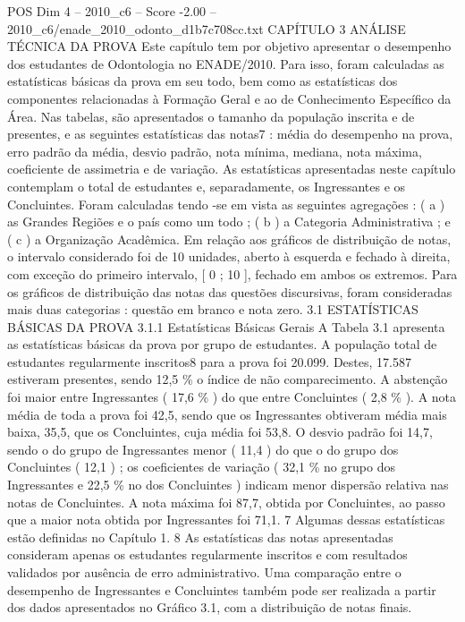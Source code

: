 \begin{textsample}{POS Dim 4 – 2010\_c6 – Score -2.00 – 2010\_c6/enade\_2010\_odonto\_d1b7c708cc.txt}  \label{ex:f4_pos_317}
CAPÍTULO 3 ANÁLISE TÉCNICA DA PROVA Este capítulo tem por objetivo apresentar o desempenho dos estudantes de Odontologia no ENADE/2010.
Para isso, foram calculadas as estatísticas básicas da prova em seu todo, bem como as estatísticas dos componentes relacionadas à Formação Geral e ao de Conhecimento Específico da Área.
Nas tabelas, são apresentados o tamanho da população inscrita e de presentes, e as seguintes estatísticas das notas7 : média do desempenho na prova, erro padrão da média, desvio padrão, nota mínima, mediana, nota máxima, coeficiente de assimetria e de variação.
As estatísticas apresentadas neste capítulo contemplam o total de estudantes e, separadamente, os Ingressantes e os Concluintes.
Foram calculadas tendo -se em vista as seguintes agregações : ( a ) as Grandes Regiões e o país como um todo ; ( b ) a Categoria Administrativa ; e ( c ) a Organização Acadêmica.
Em relação aos gráficos de distribuição de notas, o intervalo considerado foi de 10 unidades, aberto à esquerda e fechado à direita, com exceção do primeiro intervalo, [ 0 ; 10 ], fechado em ambos os extremos.
Para os gráficos de distribuição das notas das questões discursivas, foram consideradas mais duas categorias : questão em branco e nota zero. 3.1 ESTATÍSTICAS BÁSICAS DA PROVA 3.1.1 Estatísticas Básicas Gerais A Tabela 3.1 apresenta as estatísticas básicas da prova por grupo de estudantes.
A população total de estudantes regularmente inscritos8 para a prova foi 20.099.
Destes, 17.587 estiveram presentes, sendo 12,5 \% o índice de não comparecimento.
A abstenção foi maior entre Ingressantes ( 17,6 \% ) do que entre Concluintes ( 2,8 \% ).
A nota média de toda a prova foi 42,5, sendo que os Ingressantes obtiveram média mais baixa, 35,5, que os Concluintes, cuja média foi 53,8.
O desvio padrão foi 14,7, sendo o do grupo de Ingressantes menor ( 11,4 ) do que o do grupo dos Concluintes ( 12,1 ) ; os coeficientes de variação ( 32,1 \% no grupo dos Ingressantes e 22,5 \% no dos Concluintes ) indicam menor dispersão relativa nas notas de Concluintes.
A nota máxima foi 87,7, obtida por Concluintes, ao passo que a maior nota obtida por Ingressantes foi 71,1. 7 Algumas dessas estatísticas estão definidas no Capítulo 1. 8 As estatísticas das notas apresentadas consideram apenas os estudantes regularmente inscritos e com resultados validados por ausência de erro administrativo.
Uma comparação entre o desempenho de Ingressantes e Concluintes também pode ser realizada a partir dos dados apresentados no Gráfico 3.1, com a distribuição de notas finais.

\end{textsample}
